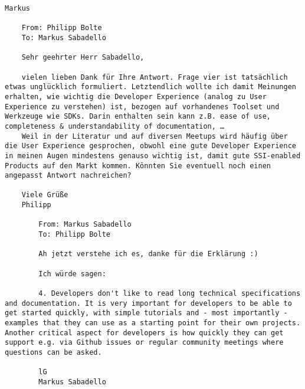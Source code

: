 \begin{Verbatim}[breaklines=true, breaksymbol={}, breaksymbolsepleftnchars=2]
Markus

    From: Philipp Bolte
    To: Markus Sabadello
    
    Sehr geehrter Herr Sabadello,

    vielen lieben Dank für Ihre Antwort. Frage vier ist tatsächlich etwas unglücklich formuliert. Letztendlich wollte ich damit Meinungen erhalten, wie wichtig die Developer Experience (analog zu User Experience zu verstehen) ist, bezogen auf vorhandenes Toolset und Werkzeuge wie SDKs. Darin enthalten sein kann z.B. ease of use, completeness & understandability of documentation, …
    Weil in der Literatur und auf diversen Meetups wird häufig über die User Experience gesprochen, obwohl eine gute Developer Experience in meinen Augen mindestens genauso wichtig ist, damit gute SSI-enabled Products auf den Markt kommen. Könnten Sie eventuell noch einen angepasst Antwort nachreichen? 
    
    Viele Grüße
    Philipp
        
        From: Markus Sabadello
        To: Philipp Bolte
        
        Ah jetzt verstehe ich es, danke für die Erklärung :) 

        Ich würde sagen:
        
        4. Developers don't like to read long technical specifications and documentation. It is very important for developers to be able to get started quickly, with simple tutorials and - most importantly - examples that they can use as a starting point for their own projects. Another critical aspect for developers is how quickly they can get support e.g. via Github issues or regular community meetings where questions can be asked.
        
        lG
        Markus Sabadello
\end{Verbatim}

